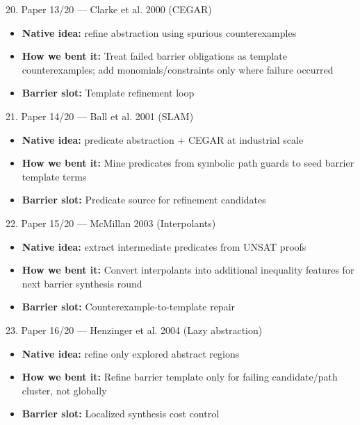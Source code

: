 \documentclass[aspectratio=169]{beamer}
\newcommand{\bendtag}[1]{\textcolor{blue!70!black}{\textbf{How we bent it:} #1}}
\newcommand{\slottag}[1]{\textcolor{teal!70!black}{\textbf{Barrier slot:} #1}}
\begin{document}
\begin{frame}[t,shrink=8]{20. Paper 13/20 — Clarke et al. 2000 (CEGAR)}
\begin{itemize}
  \item \textbf{Native idea:} refine abstraction using spurious counterexamples
  \item \bendtag{Treat failed barrier obligations as template counterexamples; add monomials/constraints only where failure occurred}
  \item \slottag{Template refinement loop}
\end{itemize}
\end{frame}

\begin{frame}[t,shrink=8]{21. Paper 14/20 — Ball et al. 2001 (SLAM)}
\begin{itemize}
  \item \textbf{Native idea:} predicate abstraction + CEGAR at industrial scale
  \item \bendtag{Mine predicates from symbolic path guards to seed barrier template terms}
  \item \slottag{Predicate source for refinement candidates}
\end{itemize}
\end{frame}

\begin{frame}[t,shrink=8]{22. Paper 15/20 — McMillan 2003 (Interpolants)}
\begin{itemize}
  \item \textbf{Native idea:} extract intermediate predicates from UNSAT proofs
  \item \bendtag{Convert interpolants into additional inequality features for next barrier synthesis round}
  \item \slottag{Counterexample-to-template repair}
\end{itemize}
\end{frame}

\begin{frame}[t,shrink=8]{23. Paper 16/20 — Henzinger et al. 2004 (Lazy abstraction)}
\begin{itemize}
  \item \textbf{Native idea:} refine only explored abstract regions
  \item \bendtag{Refine barrier template only for failing candidate/path cluster, not globally}
  \item \slottag{Localized synthesis cost control}
\end{itemize}
\end{frame}
\end{document}
